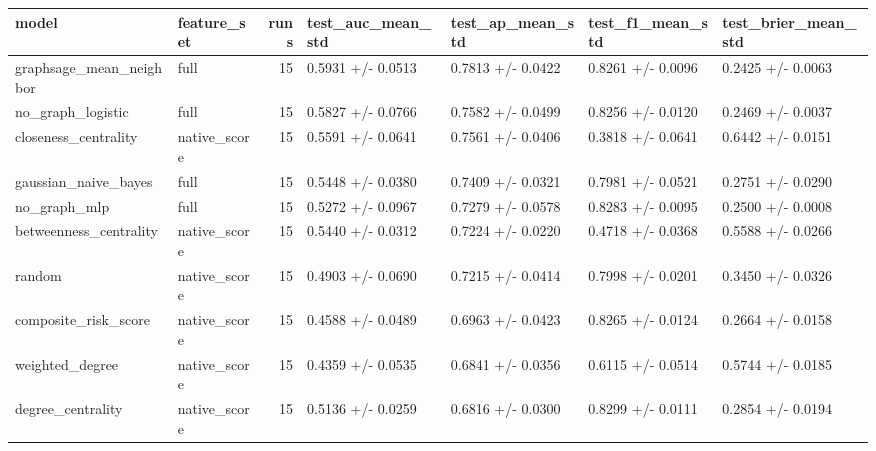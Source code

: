 \begin{tabular}{llrllll}
\toprule
model & feature\_set & runs & test\_auc\_mean\_std & test\_ap\_mean\_std & test\_f1\_mean\_std & test\_brier\_mean\_std \\
\midrule
graphsage\_mean\_neighbor & full & 15 & 0.5931 +/- 0.0513 & 0.7813 +/- 0.0422 & 0.8261 +/- 0.0096 & 0.2425 +/- 0.0063 \\
no\_graph\_logistic & full & 15 & 0.5827 +/- 0.0766 & 0.7582 +/- 0.0499 & 0.8256 +/- 0.0120 & 0.2469 +/- 0.0037 \\
closeness\_centrality & native\_score & 15 & 0.5591 +/- 0.0641 & 0.7561 +/- 0.0406 & 0.3818 +/- 0.0641 & 0.6442 +/- 0.0151 \\
gaussian\_naive\_bayes & full & 15 & 0.5448 +/- 0.0380 & 0.7409 +/- 0.0321 & 0.7981 +/- 0.0521 & 0.2751 +/- 0.0290 \\
no\_graph\_mlp & full & 15 & 0.5272 +/- 0.0967 & 0.7279 +/- 0.0578 & 0.8283 +/- 0.0095 & 0.2500 +/- 0.0008 \\
betweenness\_centrality & native\_score & 15 & 0.5440 +/- 0.0312 & 0.7224 +/- 0.0220 & 0.4718 +/- 0.0368 & 0.5588 +/- 0.0266 \\
random & native\_score & 15 & 0.4903 +/- 0.0690 & 0.7215 +/- 0.0414 & 0.7998 +/- 0.0201 & 0.3450 +/- 0.0326 \\
composite\_risk\_score & native\_score & 15 & 0.4588 +/- 0.0489 & 0.6963 +/- 0.0423 & 0.8265 +/- 0.0124 & 0.2664 +/- 0.0158 \\
weighted\_degree & native\_score & 15 & 0.4359 +/- 0.0535 & 0.6841 +/- 0.0356 & 0.6115 +/- 0.0514 & 0.5744 +/- 0.0185 \\
degree\_centrality & native\_score & 15 & 0.5136 +/- 0.0259 & 0.6816 +/- 0.0300 & 0.8299 +/- 0.0111 & 0.2854 +/- 0.0194 \\
\bottomrule
\end{tabular}

